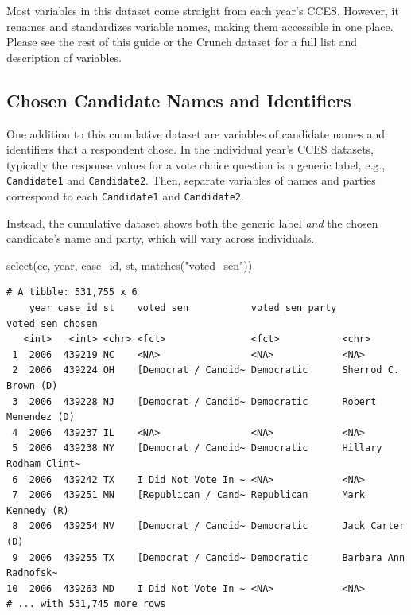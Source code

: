\documentclass[10pt,article,oneside]{memoir}
\theoremstyle{definition}
\newenvironment{Shaded}{\begin{snugshade}}{\end{snugshade}}
\newcommand{\FunctionTok}[1]{\textcolor[rgb]{0.00,0.00,0.00}{#1}}
\newcommand{\NormalTok}[1]{#1}
\newcommand{\StringTok}[1]{\textcolor[rgb]{0.31,0.60,0.02}{#1}}
\begin{document}
Most variables in this dataset come straight from each year's CCES.
However, it renames and standardizes variable names, making them
accessible in one place. Please see the rest of this guide or the Crunch
dataset for a full list and description of variables.

\hypertarget{chosen-candidate-names-and-identifiers}{%
\subsection{Chosen Candidate Names and
Identifiers}\label{chosen-candidate-names-and-identifiers}}

One addition to this cumulative dataset are variables of candidate names
and identifiers that a respondent chose. In the individual year's CCES
datasets, typically the response values for a vote choice question is a
generic label, e.g., \texttt{Candidate1} and \texttt{Candidate2}. Then,
separate variables of names and parties correspond to each
\texttt{Candidate1} and \texttt{Candidate2}.

Instead, the cumulative dataset shows both the generic label \emph{and}
the chosen candidate's name and party, which will vary across
individuals.

\begin{Shaded}
\begin{Highlighting}[]
\FunctionTok{select}\NormalTok{(cc, year, case\_id, st, }\FunctionTok{matches}\NormalTok{(}\StringTok{"voted\_sen"}\NormalTok{))}
\end{Highlighting}
\end{Shaded}

\begin{verbatim}
# A tibble: 531,755 x 6
    year case_id st    voted_sen           voted_sen_party voted_sen_chosen     
   <int>   <int> <chr> <fct>               <fct>           <chr>                
 1  2006  439219 NC    <NA>                <NA>            <NA>                 
 2  2006  439224 OH    [Democrat / Candid~ Democratic      Sherrod C. Brown (D) 
 3  2006  439228 NJ    [Democrat / Candid~ Democratic      Robert Menendez (D)  
 4  2006  439237 IL    <NA>                <NA>            <NA>                 
 5  2006  439238 NY    [Democrat / Candid~ Democratic      Hillary Rodham Clint~
 6  2006  439242 TX    I Did Not Vote In ~ <NA>            <NA>                 
 7  2006  439251 MN    [Republican / Cand~ Republican      Mark Kennedy (R)     
 8  2006  439254 NV    [Democrat / Candid~ Democratic      Jack Carter (D)      
 9  2006  439255 TX    [Democrat / Candid~ Democratic      Barbara Ann Radnofsk~
10  2006  439263 MD    I Did Not Vote In ~ <NA>            <NA>                 
# ... with 531,745 more rows
\end{verbatim}
\end{document}
